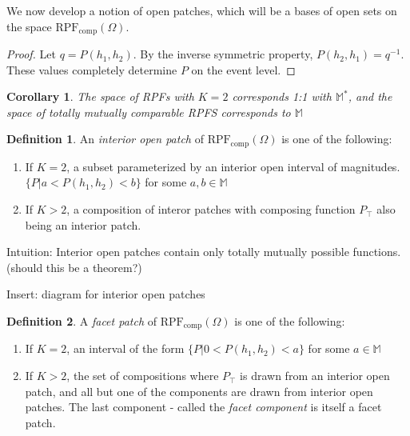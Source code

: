 \documentclass[twoside]{article}
\theoremstyle{plain}%
\newtheorem*{corollary}{Corollary}
\theoremstyle{definition}
\newtheorem{definition}{Definition}[section]
\theoremstyle{remark}
\begin{document}
We now develop a notion of open patches, which will be a bases of open sets on the space \(\text{RPF}_{\text{comp}}(\Omega)\).

\begin{proof}
Let \(q = P(h_1, h_2)\). By the inverse symmetric property, \(P(h_2, h_1) = q^{-1}\). These values completely determine \(P\) on the event level.
\end{proof}

\begin{corollary}
The space of RPFs with \(K = 2\) corresponds 1:1 with \(\mathbb{M}^*\), and the space of totally mutually comparable RPFS corresponds to \(\mathbb{M}\)
\end{corollary}

\begin{definition}
An \textit{interior open patch} of \(\text{RPF}_{\text{comp}}(\Omega)\) is one of the following:

\begin{enumerate}
  \item If \(K = 2\), a subset parameterized by an interior open interval of magnitudes. \(\{P | a < P(h_1, h_2) < b\}\) for some \(a, b \in \mathbb{M}\) 
  \item If \(K > 2\), a composition of interor patches with composing function \(P_{\top}\) also being an interior patch.
\end{enumerate}
\end{definition}

Intuition: Interior open patches contain only totally mutually possible functions. (should this be a theorem?)

Insert: diagram for interior open patches

\begin{definition}
A \textit{facet patch} of \(\text{RPF}_{\text{comp}}(\Omega)\) is one of the following:

\begin{enumerate}
  \item If \(K = 2\), an interval of the form \(\{P | 0 < P(h_1, h_2) < a\}\) for some \(a \in \mathbb{M}\) 
  \item If \(K > 2\), the set of compositions where \(P_{\top}\) is drawn from an interior open patch, and all but one of the components are drawn from interior open patches. The last component - called the \textit{facet component} is itself a facet patch.
\end{enumerate}
\end{definition}
\end{document}
